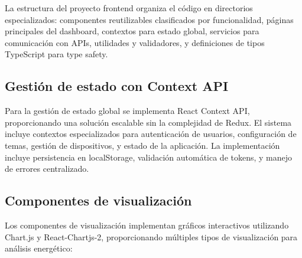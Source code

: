 La estructura del proyecto frontend organiza el código en directorios especializados: componentes reutilizables clasificados por funcionalidad, páginas principales del dashboard, contextos para estado global, servicios para comunicación con APIs, utilidades y validadores, y definiciones de tipos TypeScript para type safety.

\subsection{Gestión de estado con Context API}

Para la gestión de estado global se implementa React Context API, proporcionando una solución escalable sin la complejidad de Redux. El sistema incluye contextos especializados para autenticación de usuarios, configuración de temas, gestión de dispositivos, y estado de la aplicación. La implementación incluye persistencia en localStorage, validación automática de tokens, y manejo de errores centralizado.

\subsection{Componentes de visualización}

Los componentes de visualización implementan gráficos interactivos utilizando Chart.js y React-Chartjs-2, proporcionando múltiples tipos de visualización para análisis energético:

